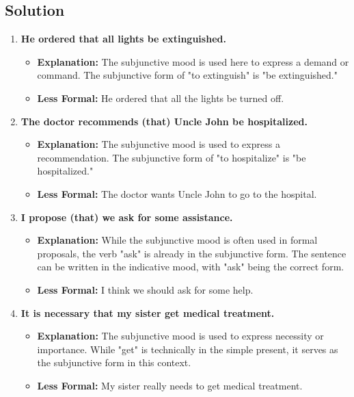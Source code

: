 \subsection*{Solution}
\begin{enumerate}
      \item \textbf{He ordered that all lights be extinguished.}
            \begin{itemize}
                  \item \textbf{Explanation:} The subjunctive mood is used here to express a demand or command. The subjunctive form of "to extinguish" is "be extinguished."
                  \item \textbf{Less Formal:} He ordered that all the lights be turned off.
            \end{itemize}
      \item \textbf{The doctor recommends (that) Uncle John be hospitalized.}
            \begin{itemize}
                  \item \textbf{Explanation:} The subjunctive mood is used to express a recommendation. The subjunctive form of "to hospitalize" is "be hospitalized."
                  \item \textbf{Less Formal:} The doctor wants Uncle John to go to the hospital.
            \end{itemize}
      \item \textbf{I propose (that) we ask for some assistance.}
            \begin{itemize}
                  \item \textbf{Explanation:} While the subjunctive mood is often used in formal proposals, the verb "ask" is already in the subjunctive form. The sentence can be written in the indicative mood, with "ask" being the correct form.
                  \item \textbf{Less Formal:} I think we should ask for some help.
            \end{itemize}
      \item \textbf{It is necessary that my sister get medical treatment.}
            \begin{itemize}
                  \item \textbf{Explanation:} The subjunctive mood is used to express necessity or importance. While "get" is technically in the simple present, it serves as the subjunctive form in this context.
                  \item \textbf{Less Formal:} My sister really needs to get medical treatment.

\end{itemize}
\end{enumerate}
